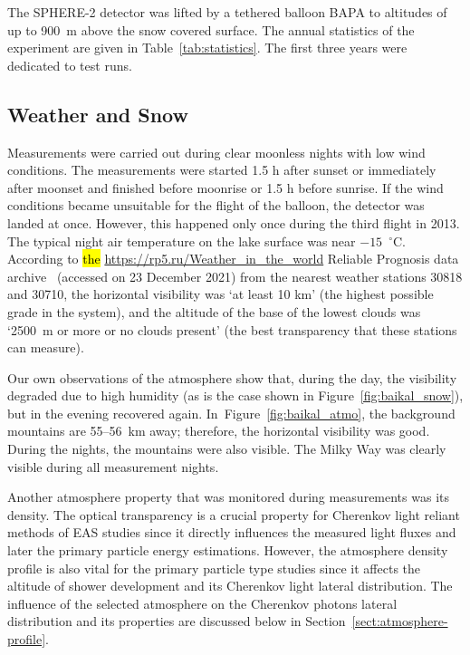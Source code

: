 \documentclass[universe,article,accept,moreauthors,pdftex]{Definitions/mdpi}
\begin{document}
The \mbox{SPHERE-2} detector was lifted by a tethered balloon BAPA to altitudes of up to 900~m above the snow covered surface. The annual statistics of the experiment are given in Table~\ref{tab:statistics}. The first three years were dedicated to test runs. 






\subsection{Weather and Snow}

Measurements were carried out during clear moonless nights with low wind conditions. The measurements were started 1.5 h after sunset or immediately after moonset and finished before moonrise or 1.5 h before sunrise. If the wind conditions became unsuitable for the flight of the balloon, the detector was landed at once. However, this happened only once during the third flight in 2013. The typical night air temperature on the lake surface was near $-15$~$^\circ$C. According to \hl{the} \url{https://rp5.ru/Weather_in_the_world} {Reliable Prognosis} data archive~\cite{rp5} (accessed on 23 December 2021) from the nearest weather stations 30818 and 30710, the horizontal visibility was `at least 10 km' (the highest possible grade in the system), and the altitude of the base of the lowest clouds was `2500~m or more or no clouds present' (the best transparency that these stations can measure).%

Our own observations of the atmosphere show that, during the day, the visibility degraded due to high humidity (as is the case shown in Figure~\ref{fig:baikal_snow}), but in the evening recovered again. In~Figure~\ref{fig:baikal_atmo}, the background mountains are 55--56~km away; therefore, the horizontal visibility was good. During the nights, the mountains were also visible. The Milky Way was clearly visible during all measurement nights. 






Another atmosphere property that was monitored during measurements was its density. The optical transparency is a crucial property for Cherenkov light reliant methods of EAS studies since it directly influences the measured light fluxes and later the primary particle energy estimations. However, the atmosphere density profile is also vital for the primary particle type studies since it affects the altitude of shower development and its Cherenkov light lateral distribution. The influence of the selected atmosphere on the Cherenkov photons lateral distribution and its properties are discussed below in Section~\ref{sect:atmosphere-profile}.
\end{document}
